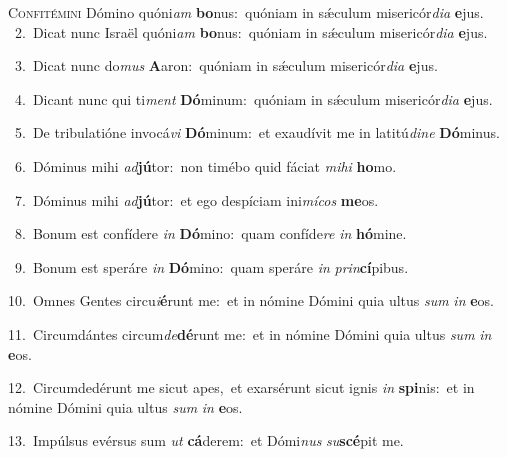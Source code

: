 \lettrine{\initial\textcolor{\initialcolor}{C}}{onfitémini} Dómino quóni\textit{am} \textbf{bo}\-nus:~\star quóniam in sǽculum misericór\-\textit{di}\-\textit{a} \textbf{e}\-jus.\\
{\numbfont\textcolor{\numbcolor}{~2.}}~Dicat nunc Israël quóni\textit{am} \textbf{bo}\-nus:~\star quóniam in sǽculum misericór\-\textit{di}\-\textit{a} \textbf{e}\-jus.\par
{\numbfont\textcolor{\numbcolor}{~3.}}~Dicat nunc do\textit{mus} \textbf{A}\-aron:~\star quóniam in sǽculum misericór\-\textit{di}\-\textit{a} \textbf{e}\-jus.\par
{\numbfont\textcolor{\numbcolor}{~4.}}~Dicant nunc qui ti\textit{ment} \textbf{Dó}\-minum:~\star quóniam in sǽculum misericór\-\textit{di}\-\textit{a} \textbf{e}\-jus.\par
{\numbfont\textcolor{\numbcolor}{~5.}}~De tribulatióne invocá\textit{vi} \textbf{Dó}\-minum:~\star et exaudívit me in latitú\-\textit{di}\-\textit{ne} \textbf{Dó}\-minus.\par
{\numbfont\textcolor{\numbcolor}{~6.}}~Dóminus mihi \textit{ad}\-\textbf{jú}tor:~\star non timébo quid fáciat \textit{mi}\-\textit{hi} \textbf{ho}\-mo.\par
{\numbfont\textcolor{\numbcolor}{~7.}}~Dóminus mihi \textit{ad}\-\textbf{jú}tor:~\star et ego despíciam ini\-\textit{mí}\-\textit{cos} \textbf{me}\-os.\par
{\numbfont\textcolor{\numbcolor}{~8.}}~Bonum est confídere \textit{in} \textbf{Dó}\-mino:~\star quam confíde\textit{re} \textit{in} \textbf{hó}\-mine.\par
{\numbfont\textcolor{\numbcolor}{~9.}}~Bonum est speráre \textit{in} \textbf{Dó}\-mino:~\star quam speráre \textit{in} \textit{prin}\-\textbf{cí}pibus.\par
{\numbfont\textcolor{\numbcolor}{10.}}~Omnes Gentes circu\-\textit{i}\-\textbf{é}runt me:~\star et in nómine Dómini quia ultus \textit{sum} \textit{in} \textbf{e}\-os.\par
{\numbfont\textcolor{\numbcolor}{11.}}~Circumdántes circum\-\textit{de}\-\textbf{dé}runt me:~\star et in nómine Dómini quia ultus \textit{sum} \textit{in} \textbf{e}\-os.\par
{\numbfont\textcolor{\numbcolor}{12.}}~Circumdedérunt me sicut apes,~\dagger et exarsérunt sicut ignis \textit{in} \textbf{spi}\-nis:~\star et in nómine Dómini quia ultus \textit{sum} \textit{in} \textbf{e}\-os.\par
{\numbfont\textcolor{\numbcolor}{13.}}~Impúlsus evérsus sum \textit{ut} \textbf{cá}\-derem:~\star et Dómi\textit{nus} \textit{su}\-\textbf{scé}pit me.\par
